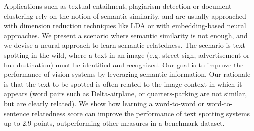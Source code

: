 Applications such as textual entailment, plagiarism detection or document clustering rely on the notion of semantic similarity, and are usually approached with dimension reduction techniques like LDA or with embedding-based neural approaches. We present a scenario where semantic similarity is not enough, and we devise a neural approach to learn semantic relatedness. The scenario is text spotting in the wild,  where a text in an image (e.g. street sign, advertisement or bus destination) must be identified and recognized. Our goal is to improve the performance of vision systems by leveraging semantic information. Our rationale is that the text to be spotted is often related to the image context in which it appears (word pairs such as Delta-airplane, or quarters-parking are not similar, but are clearly related). We show how learning a word-to-word or word-to-sentence relatedness score can improve the performance of text spotting systems up to 2.9 points, outperforming other measures in a benchmark dataset.